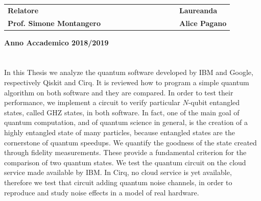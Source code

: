 \documentclass[11pt, a4paper, twoside, openright]{book}
\renewcommand{\'}[0]{\`}
\theoremstyle{definition}
\begin{document}
\begin{titlepage}
\vspace{20mm}
\begin{spacing}{2}
\begin{tabular}{ l  c  c c c  cc c c c c  l }
{\Large{\bf Relatore}} &&&&&&&&&&& {\Large{\bf Laureanda}}\\
{\Large{\bf Prof. Simone Montangero}} &&&&&&&&&&& {\Large{\bf Alice Pagano}}\\
\end{tabular}
\end{spacing}
\vspace{15 mm}

\begin{center}
{\Large{\bf Anno Accademico 2018/2019}}
\end{center}
\end{titlepage}
\clearpage{\pagestyle{empty}\cleardoublepage}



\chapter*{}
\noindent In this Thesis we analyze the quantum software developed by IBM and Google, respectively Qiskit and Cirq. It is reviewed how to program a simple quantum algorithm on both software and 
they are compared. 
In order to test their performance, we implement a circuit to verify particular $N$-qubit entangled states, called GHZ states, in both software.
In fact, one of the main goal of quantum computation, and of quantum science in general, is the creation of a highly entangled state of many particles, because entangled states are
the cornerstone of quantum speedups. We quantify the goodness of the state created through fidelity measurements. These provide a fundamental criterion for the comparison of two quantum states.
We test the quantum circuit on the cloud service made available by IBM. In Cirq, no cloud service is yet available, therefore we test that circuit adding quantum noise channels, in order to reproduce and study noise effects in a model of real hardware.

\end{document}
